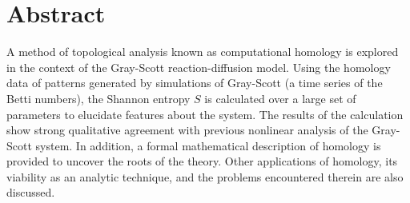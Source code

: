     \chapter*{Abstract}

A method of topological analysis known as computational homology is explored in the context of the Gray-Scott reaction-diffusion model. Using the homology data of patterns generated by simulations of Gray-Scott (a time series of the Betti numbers), the Shannon entropy $S$ is calculated over a large set of parameters to elucidate features about the system. The results of the calculation show strong qualitative agreement with previous nonlinear analysis of the Gray-Scott system. In addition, a formal mathematical description of homology is provided to uncover the roots of the theory. Other applications of homology, its viability as an analytic technique, and the problems encountered therein are also discussed.